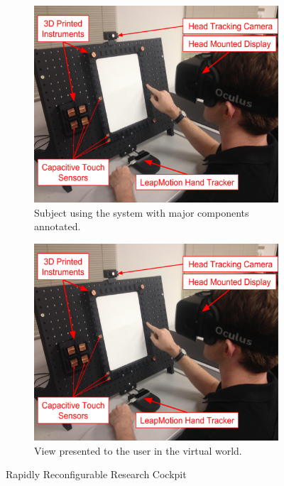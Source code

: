 \documentclass[]{aiaa-tc}%
\begin{document}
\begin{figure}[tb]
  \centering
  \begin{subfigure}{.49\textwidth}
    \centering
    \includegraphics[width=.99\linewidth]{figures/r3c_callout.png}
    \caption{Subject using the system with major components annotated.}
    \label{fig:r3c_sub1}
  \end{subfigure}
  \begin{subfigure}{.49\textwidth}
    \centering
    \includegraphics[width=.99\linewidth]{figures/r3c_callout.png}
    \caption{View presented to the user in the virtual world.}
    \label{fig:r3c_sub2}
  \end{subfigure}
  \caption{Rapidly Reconfigurable Research Cockpit}
  \label{fig:r3c}
\end{figure}
\end{document}
